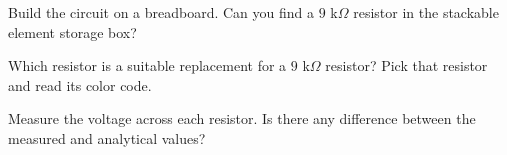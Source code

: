 \documentclass[11pt]{article}
\begin{document}
\begin{question}
    \begin{subquestion}{Build the circuit on a breadboard. Can you find a $9$ k$\Omega$ resistor in the stackable element storage box? }
        \answer{
        }
    \end{subquestion}

    \begin{subquestion}{Which resistor is a suitable replacement for a $9$ k$\Omega$ resistor? Pick that resistor and read its color code.}
        \answer{}
    \end{subquestion}

    \begin{subquestion}{Measure the voltage across each resistor. Is there any difference between the measured and analytical values?}
        \answer{}
    \end{subquestion}

\end{question}


\end{document}

